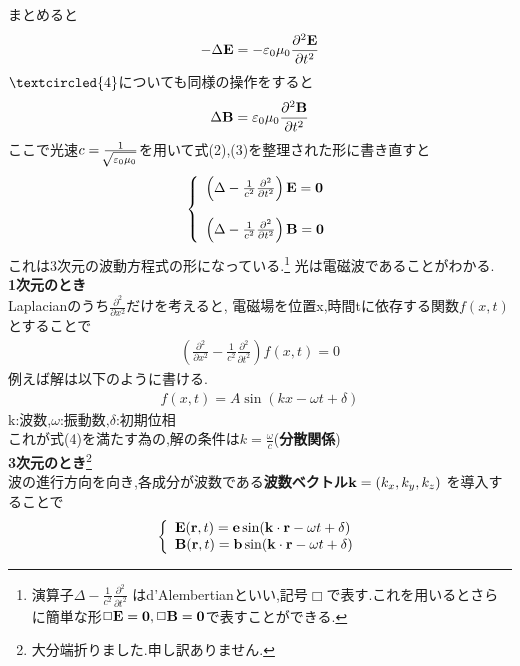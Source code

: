 \documentclass[../main]{subfiles}
\begin{document}
まとめると
\begin{eqnarray}
- \Delta {\bf E} = - \varepsilon_0 \mu_0 \frac{\partial^2 {\bf E}}{\partial t^2}
\end{eqnarray}
$\textcircled{\scriptsize 4}$についても同様の操作をすると
\begin{eqnarray}
\Delta {\bf B} = \varepsilon_0 \mu_0 \frac{\partial^2 {\bf B}}{\partial t^2}
\end{eqnarray}
ここで光速$c=\frac{1}{\sqrt[]{\mathstrut \varepsilon_0 \mu_0}}$を用いて式(2),(3)を整理された形に書き直すと
\begin{equation*}
\left \{
\begin{array}{l}
\left( \Delta - \frac{1}{c^2}\frac{\partial^2}{\partial t^2} \right) {\bf E} = {\bf 0} \\
\\
\left( \Delta - \frac{1}{c^2}\frac{\partial^2}{\partial t^2} \right) {\bf B} = {\bf 0}
\end{array}
\right.
\end{equation*}
これは3次元の波動方程式の形になっている.\footnote{演算子$\Delta - \frac{1}{c^2}\frac{\partial^2}{\partial t^2}$ はd'Alembertianといい,記号$\Box$で表す.これを用いるとさらに簡単な形$\Box {\bf E}={\bf 0},\Box {\bf B}={\bf 0}$で表すことができる.}
光は電磁波であることがわかる. \\
{\bf 1次元のとき} \\
Laplacianのうち$\frac{\partial^2}{\partial x^2}$だけを考えると,
電磁場を位置x,時間tに依存する関数$f(x,t)$とすることで
\begin{eqnarray}
\left( \frac{\partial^2}{\partial x^2} - \frac{1}{c^2}\frac{\partial^2}{\partial t^2} \right) f(x,t) =0
\end{eqnarray}
例えば解は以下のように書ける.
\begin{eqnarray*}
f(x,t) = A \sin (kx-\omega t + \delta)
\end{eqnarray*}
k:波数,$\omega$:振動数,$\delta$:初期位相 \\
これが式(4)を満たす為の,解の条件は$k=\frac{\omega}{c}$({\bf 分散関係}) \\
{\bf 3次元のとき}\footnote{大分端折りました.申し訳ありません.} \\
波の進行方向を向き,各成分が波数である{\bf 波数ベクトル}${\bf k}=(k_x,k_y,k_z)$ を導入することで
\begin{eqnarray}
\left \{
\begin{array}{l}
{\bf E}({\bf r},t)={\bf e} \sin({\bf k}\cdot{\bf r}-\omega t + \delta) \\
{\bf B}({\bf r},t)={\bf b} \sin({\bf k}\cdot{\bf r}-\omega t + \delta)
\end{array}
\right.
\end{eqnarray}
\end{document}
